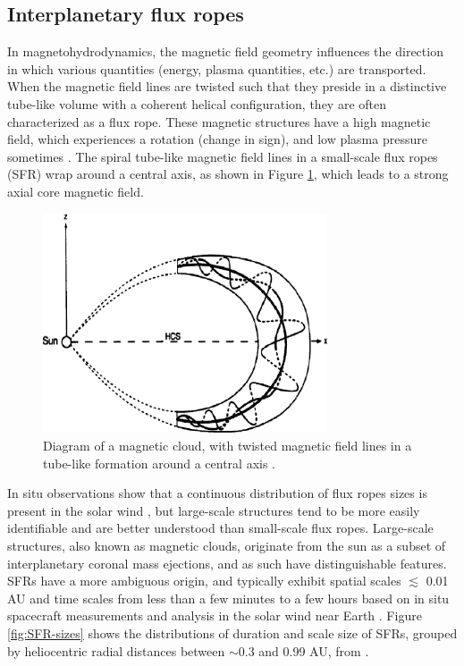 

\subsection{Interplanetary flux ropes}
In magnetohydrodynamics, the magnetic field geometry influences the direction in which various quantities (energy, plasma quantities, etc.) are transported. When the magnetic field lines are twisted such that they preside in a distinctive tube-like volume with a coherent helical configuration, they are often characterized as a flux rope. These magnetic structures have a high magnetic field, which experiences a rotation (change in sign), and low plasma pressure sometimes \citep{Cartwright:2008}. The spiral tube-like magnetic field lines in a small-scale flux ropes (\gls{SFR}) wrap around a central axis, as shown in Figure \ref{fig:FR-diagram}, which leads to a strong axial core magnetic field.

\begin{figure}[ht!]
    \centering
    \includegraphics[width=0.75\textwidth]{Figures/fluxrope.png}
    \caption{Diagram of a magnetic cloud, with twisted magnetic field lines in a tube-like formation around a central axis \citep{Feng:2020}.}
    \label{fig:FR-diagram}
\end{figure}

In situ observations show that a continuous distribution of flux ropes sizes is present in the solar wind \citep{Feng:2007, Hu:2018}, but large-scale structures tend to be more easily identifiable and are better understood than small-scale flux ropes. Large-scale structures, also known as magnetic clouds, originate from the sun as a subset of interplanetary coronal mass ejections, and as such have distinguishable features. SFRs have a more ambiguous origin, and typically exhibit spatial scales $\lesssim$ 0.01 AU and time scales from less than a few minutes to a few hours based on in situ spacecraft measurements and analysis in the solar wind near Earth \citep{Cartwright:2010, Feng:2007, Hu:2018}. Figure \ref{fig:SFR-sizes} shows the distributions of duration and scale size of SFRs, grouped by heliocentric radial distances between $\sim$0.3 and 0.99 AU, from \cite{ChenHu:2020}.

